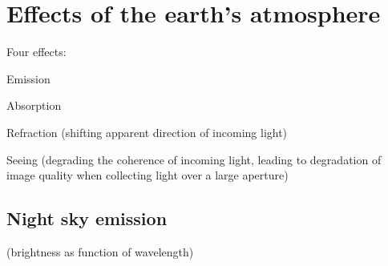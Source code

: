 \documentclass[12pt]{article}
\begin{document}
\newpage
\section*{Effects of the earth's atmosphere}

Four effects:
\begin{enumerate*}
    \item Emission
    \item Absorption
    \item Refraction (shifting apparent direction of incoming light)
    \item Seeing (degrading the coherence of incoming light,
        leading to degradation of image quality when collecting light
        over a large aperture)
\end{enumerate*}

\subsection*{Night sky emission}
(brightness as function of wavelength)
\end{document}
